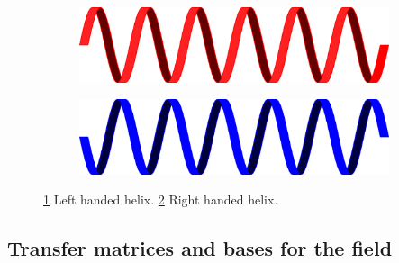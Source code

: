 \begin{figure}
	\centering
	\begin{subfigure}{0.49\textwidth}
		\includegraphics[width=\textwidth]{images/left_handed.png}
		\caption{}
		\label{fig:left_handed}
	\end{subfigure}
	\begin{subfigure}{0.49\textwidth}
		\includegraphics[width=\textwidth]{images/right_handed.png}
		\caption{}
		\label{fig:right_handed}
	\end{subfigure}
	\caption[Helix handedness]{\ref{fig:left_handed} Left handed helix. \ref{fig:right_handed} Right handed helix.}
	\label{fig:handedness}
\end{figure}

\subsection{Transfer matrices and bases for the field}

